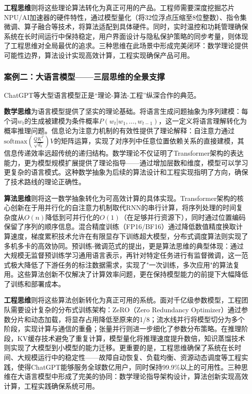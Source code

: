 \textbf{工程思维}则将这些理论算法转化为真正可用的产品。工程师需要深度挖掘芯片NPU/AI加速器的硬件特性，通过模型量化（将32位浮点压缩至8位整数）、指令集微调、算子融合等技术，将算法适配到具体硬件。同时，实时温控和功耗管理确保系统在长时间运行中保持稳定，用户界面设计与隐私保护策略的同步考量，则体现了工程思维对全局最优的追求。三种思维在此场景中形成完美闭环：数学理论提供可能性边界，算法设计实现高效计算，工程实现确保产品可用。

\subsubsection{案例二：大语言模型——三层思维的全景支撑}

ChatGPT等大型语言模型正是“理论-算法-工程”纵深合作的典范。

\textbf{数学思维}为语言模型提供了坚实的理论基础。将语言生成问题抽象为序列建模：每个词$w_t$的生成被建模为条件概率$P(w_t|w_1,\ldots,w_{t-1})$，这一定义将语言理解转化为概率推理问题。信息论为注意力机制的有效性提供了理论解释：自注意力通过$\text{softmax}(\frac{QK^T}{\sqrt{d_k}})V$的矩阵运算，实现了对序列中任意位置依赖关系的直接建模，其信息传递效率远超传统的递归结构。数学理论不仅证明了Transformer架构的表达能力，更为模型规模扩展提供了理论指导——通过增加层数和维度，模型可以学习更复杂的语言模式。这种数学抽象为后续的算法设计和工程实现指明了方向，确保了技术路线的理论正确性。

\textbf{算法思维}则将这一数学抽象转化为可高效计算的具体实现。Transformer架构的核心创新在于用并行化的自注意力机制取代RNN的串行计算，将序列处理的时间复杂度从$O(n)$降低到可并行化的$O(1)$（在足够并行资源下），同时通过位置编码保留了序列的顺序信息。混合精度训练（FP16/BF16）通过降低数值精度换取计算速度，梯度累积技术允许在有限显存下训练超大模型，分布式调度算法则实现了多机多卡的高效协同。预训练-微调范式的提出，更是算法思维的典型体现：通过大规模无监督预训练学习通用语言表示，再针对特定任务进行有监督微调，这一范式极大降低了下游任务的标注数据需求，实现了"一次训练，多次应用"的算法复用。这些算法创新不仅解决了计算效率问题，更在保持模型能力的前提下大幅降低了训练和部署成本。

\textbf{工程思维}则将这些算法创新转化为真正可用的系统。面对千亿级参数模型，工程团队需要设计复杂的分布式训练架构：ZeRO（Zero Redundancy Optimizer）通过参数分片和动态加载，将显存占用降低至原来的1/8；流水线并行将模型切分为多个阶段，实现计算与通信的重叠；张量并行则进一步细化了参数分布策略。在推理阶段，KV缓存技术避免了重复计算，模型量化将推理速度提升数倍，知识蒸馏技术则实现了大模型到小模型的能力迁移。更重要的是，工程思维确保了系统在长时间、大规模运行中的稳定性——故障自动恢复、负载均衡、资源动态调度等工程实践，使得ChatGPT能够服务全球数亿用户，同时保持99.9\%以上的可用性。三种思维在大语言模型中形成了完美的协同：数学理论指导架构设计，算法创新实现高效计算，工程实践确保系统可用。

